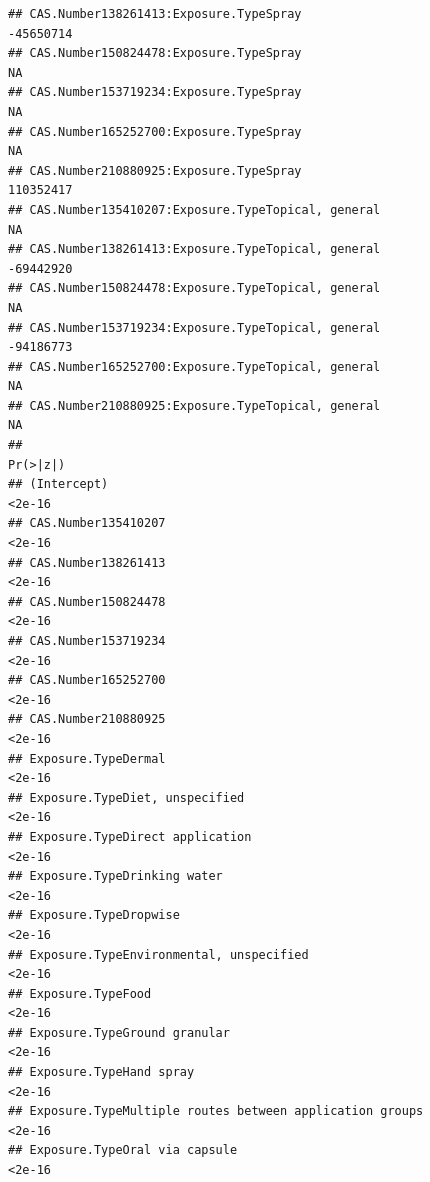 \documentclass[
  12pt,
]{article}
\begin{document}
\begin{verbatim}
## CAS.Number138261413:Exposure.TypeSpray                                       -45650714
## CAS.Number150824478:Exposure.TypeSpray                                              NA
## CAS.Number153719234:Exposure.TypeSpray                                              NA
## CAS.Number165252700:Exposure.TypeSpray                                              NA
## CAS.Number210880925:Exposure.TypeSpray                                       110352417
## CAS.Number135410207:Exposure.TypeTopical, general                                   NA
## CAS.Number138261413:Exposure.TypeTopical, general                            -69442920
## CAS.Number150824478:Exposure.TypeTopical, general                                   NA
## CAS.Number153719234:Exposure.TypeTopical, general                            -94186773
## CAS.Number165252700:Exposure.TypeTopical, general                                   NA
## CAS.Number210880925:Exposure.TypeTopical, general                                   NA
##                                                                             Pr(>|z|)
## (Intercept)                                                                   <2e-16
## CAS.Number135410207                                                           <2e-16
## CAS.Number138261413                                                           <2e-16
## CAS.Number150824478                                                           <2e-16
## CAS.Number153719234                                                           <2e-16
## CAS.Number165252700                                                           <2e-16
## CAS.Number210880925                                                           <2e-16
## Exposure.TypeDermal                                                           <2e-16
## Exposure.TypeDiet, unspecified                                                <2e-16
## Exposure.TypeDirect application                                               <2e-16
## Exposure.TypeDrinking water                                                   <2e-16
## Exposure.TypeDropwise                                                         <2e-16
## Exposure.TypeEnvironmental, unspecified                                       <2e-16
## Exposure.TypeFood                                                             <2e-16
## Exposure.TypeGround granular                                                  <2e-16
## Exposure.TypeHand spray                                                       <2e-16
## Exposure.TypeMultiple routes between application groups                       <2e-16
## Exposure.TypeOral via capsule                                                 <2e-16

\end{verbatim}
\end{document}
